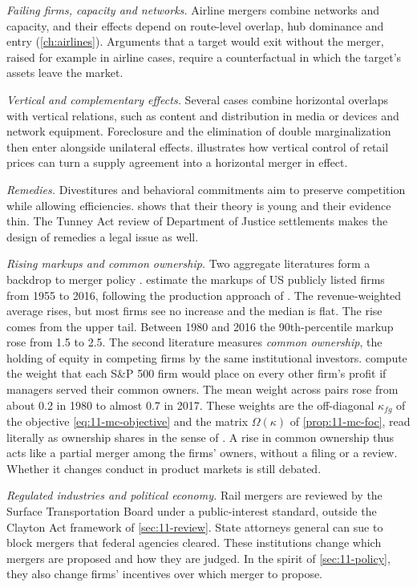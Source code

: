\emph{Failing firms, capacity and networks.} Airline mergers combine networks and capacity, and their effects depend on
route-level overlap, hub dominance and entry (\cref{ch:airlines}). Arguments that a target would exit without the merger,
raised for example in airline cases, require a counterfactual in which the target's assets leave the market.

\emph{Vertical and complementary effects.} Several cases combine horizontal overlaps with vertical relations, such as
content and distribution in media or devices and network equipment. Foreclosure and the elimination of double
marginalization then enter alongside unilateral effects. \citet{Houde2012} illustrates how vertical control of retail
prices can turn a supply agreement into a horizontal merger in effect.

\emph{Remedies.} Divestitures and behavioral commitments aim to preserve competition while allowing efficiencies.
 shows that their theory is young and their evidence thin. The Tunney Act review of Department
of Justice settlements makes the design of remedies a legal issue as well.

\emph{Rising markups and common ownership.} Two aggregate literatures form a backdrop to merger policy
\citep[pp.~257--261]{AskerNocke2021}. \citet{DeLoeckerEeckhoutUnger2020} estimate the markups of US publicly listed
firms from 1955 to 2016, following the production approach of \citet{DeLoeckerWarzynski2012}. The revenue-weighted
average rises, but most firms see no increase and the median is flat. The rise comes from the upper tail. Between
1980 and 2016 the 90th-percentile markup rose from 1.5 to 2.5. The second literature measures \emph{common ownership},
the holding of equity in competing firms by the same institutional investors. \citet{BackusConlonSinkinson2021a}
compute the weight that each S\&P 500 firm would place on every other firm's profit if managers served their common
owners. The mean weight across pairs rose from about 0.2 in 1980 to almost 0.7 in 2017. These weights are the
off-diagonal $\kappa_{fg}$ of the objective \eqref{eq:11-mc-objective} and the matrix $\Omega(\kappa)$ of
\cref{prop:11-mc-foc}, read literally as ownership shares in the sense of \citet{OBrienSalop2000}. A rise in common
ownership thus acts like a partial merger among the firms' owners, without a filing or a review. Whether it changes
conduct in product markets is still debated.

\emph{Regulated industries and political economy.} Rail mergers are reviewed by the Surface Transportation Board under a
public-interest standard, outside the Clayton Act framework of \cref{sec:11-review}. State attorneys general can sue to block
mergers that federal agencies cleared. These institutions change which mergers are proposed and how they are judged. In
the spirit of \cref{sec:11-policy}, they also change firms' incentives over which merger to propose.
